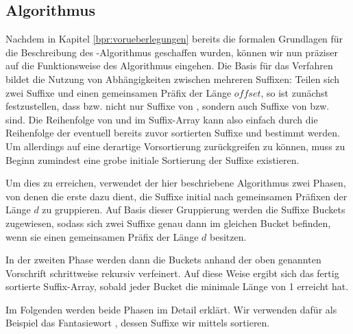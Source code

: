 \subsection{Algorithmus}
\label{bpr:algorithmus}

Nachdem in Kapitel \ref{bpr:vorueberlegungen} bereits die formalen Grundlagen für die Beschreibung des \bpr-Algorithmus geschaffen wurden, können wir nun präziser auf die Funktionsweise des Algorithmus eingehen. Die Basis für das Verfahren bildet die Nutzung von Abhängigkeiten zwischen mehreren Suffixen: Teilen sich zwei Suffixe  und  einen gemeinsamen Präfix der Länge \(\textit{offset}\), so ist zunächst festzustellen, dass  bzw.  nicht nur Suffixe von , sondern auch Suffixe von  bzw.   sind. Die Reihenfolge von  und  im Suffix-Array kann also einfach durch die Reihenfolge der eventuell bereits zuvor sortierten Suffixe  und  bestimmt werden. Um allerdings auf eine derartige Vorsortierung zurückgreifen zu können, muss zu Beginn zumindest eine grobe \glqq initiale Sortierung\grqq{} der Suffixe existieren.\par\smallskip
Um dies zu erreichen, verwendet der hier beschriebene Algorithmus zwei Phasen, von denen die erste dazu dient, die Suffixe initial nach gemeinsamen Präfixen der Länge \(d\) zu gruppieren. Auf Basis dieser Gruppierung werden die Suffixe Buckets zugewiesen, sodass sich zwei Suffixe genau dann im gleichen Bucket befinden, wenn sie einen gemeinsamen Präfix der Länge \(d\) besitzen.\par
In der zweiten Phase werden dann die Buckets anhand der oben genannten Vorschrift schrittweise rekursiv verfeinert. Auf diese Weise ergibt sich das fertig sortierte Suffix-Array, sobald jeder Bucket die minimale Länge von 1 erreicht hat.\par\smallskip
Im Folgenden werden beide Phasen im Detail erklärt. Wir verwenden dafür als Beispiel das Fantasiewort \covfefefe, dessen Suffixe wir mittels \bpr sortieren.




